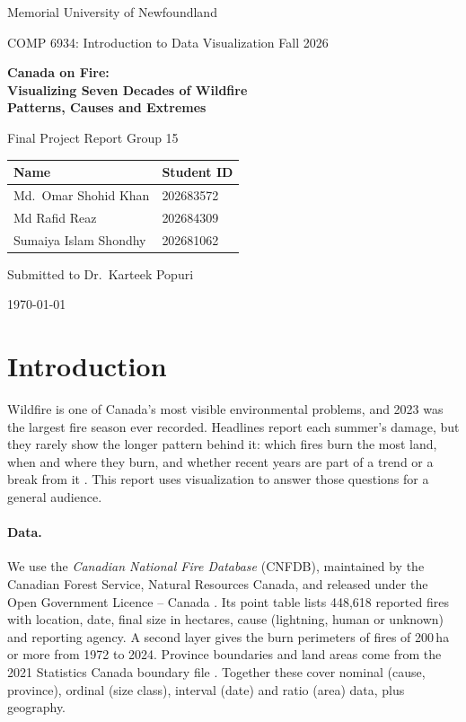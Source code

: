 \documentclass[12pt]{article}
\begin{document}
\begin{titlepage}
  \centering
  \vspace*{2cm}
  {\large Memorial University of Newfoundland\par}
  {\large COMP 6934: Introduction to Data Visualization \textperiodcentered{} Fall 2026\par}
  \vspace{2.5cm}
  {\LARGE\bfseries Canada on Fire:\\[4pt]
   Visualizing Seven Decades of Wildfire\\ Patterns, Causes and Extremes\par}
  \vspace{1.5cm}
  {\large Final Project Report \textperiodcentered{} Group 15\par}
  \vspace{2cm}
  \begin{tabular}{ll}
    \toprule
    Name & Student ID \\
    \midrule
    Md.\ Omar Shohid Khan  & 202683572 \\
    Md Rafid Reaz          & 202684309 \\
    Sumaiya Islam Shondhy  & 202681062 \\
    \bottomrule
  \end{tabular}
  \vfill
  {Submitted to Dr.\ Karteek Popuri\par}
  {\today\par}
\end{titlepage}

\setcounter{page}{1}

\section{Introduction}

Wildfire is one of Canada's most visible environmental problems, and 2023 was the
largest fire season ever recorded. Headlines report each summer's damage, but they rarely
show the longer pattern behind it: which fires burn the most land, when and where they
burn, and whether recent years are part of a trend or a break from it \citep{hanes2019}. This report uses
visualization to answer those questions for a general audience.

\paragraph{Data.} We use the \emph{Canadian National Fire Database} (CNFDB), maintained by
the Canadian Forest Service, Natural Resources Canada, and released under the Open
Government Licence -- Canada \citep{nfdb}. Its point table lists 448,618 reported fires
with location, date, final size in hectares, cause (lightning, human or unknown) and
reporting agency. A second layer gives the burn perimeters of fires of 200\,ha or more from
1972 to 2024. Province boundaries and land areas come from the 2021 Statistics Canada
boundary file \citep{statcan}. Together these cover nominal (cause, province), ordinal
(size class), interval (date) and ratio (area) data, plus geography.
\end{document}
